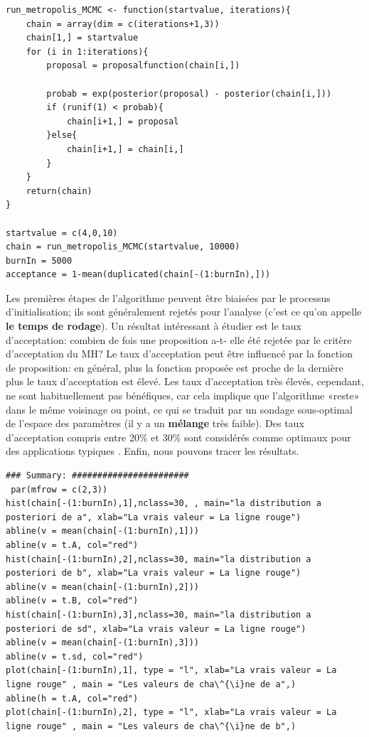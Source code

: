 \begin{Exemple}
\begin{lstlisting}
run_metropolis_MCMC <- function(startvalue, iterations){
    chain = array(dim = c(iterations+1,3))
    chain[1,] = startvalue
    for (i in 1:iterations){
        proposal = proposalfunction(chain[i,])
         
        probab = exp(posterior(proposal) - posterior(chain[i,]))
        if (runif(1) < probab){
            chain[i+1,] = proposal
        }else{
            chain[i+1,] = chain[i,]
        }
    }
    return(chain)
}
 
startvalue = c(4,0,10)
chain = run_metropolis_MCMC(startvalue, 10000)
burnIn = 5000
acceptance = 1-mean(duplicated(chain[-(1:burnIn),]))
\end{lstlisting}
Les premi\`eres \'etapes de l'algorithme peuvent être biais\'ees par le processus d'initialisation; ils sont g\'en\'eralement rejet\'es pour l'analyse (c'est ce qu'on appelle \textbf{le temps de rodage}).  
\newl Un r\'esultat int\'eressant \`a \'etudier est le taux d'acceptation: combien de fois une proposition a-t- elle \'et\'e rejet\'ee par le crit\`ere d'acceptation du MH? Le taux d'acceptation peut être influenc\'e par la fonction de proposition: en g\'en\'eral, plus la fonction propos\'ee est proche de la derni\`ere plus le taux d'acceptation est \'elev\'e.  Les taux d'acceptation tr\`es \'elev\'es, cependant, ne sont habituellement pas b\'en\'efiques, car cela implique que l'algorithme «reste» dans le même voisinage ou point, ce qui se traduit par un sondage sous-optimal de l'espace des param\`etres (il y a un \textbf{m\'elange} tr\`es faible). Des taux d'acceptation compris entre $20\%$ et $30\%$ sont consid\'er\'es comme optimaux pour des applications typiques \cite{BDA_N11}.\newl
Enfin, nous pouvons tracer les r\'esultats. 
\begin{lstlisting}
### Summary: #######################
 par(mfrow = c(2,3))
hist(chain[-(1:burnIn),1],nclass=30, , main="la distribution a posteriori de a", xlab="La vrais valeur = La ligne rouge")
abline(v = mean(chain[-(1:burnIn),1]))
abline(v = t.A, col="red")
hist(chain[-(1:burnIn),2],nclass=30, main="la distribution a posteriori de b", xlab="La vrais valeur = La ligne rouge")
abline(v = mean(chain[-(1:burnIn),2]))
abline(v = t.B, col="red")
hist(chain[-(1:burnIn),3],nclass=30, main="la distribution a posteriori de sd", xlab="La vrais valeur = La ligne rouge")
abline(v = mean(chain[-(1:burnIn),3]))
abline(v = t.sd, col="red")
plot(chain[-(1:burnIn),1], type = "l", xlab="La vrais valeur = La ligne rouge" , main = "Les valeurs de cha\^{\i}ne de a",)
abline(h = t.A, col="red")
plot(chain[-(1:burnIn),2], type = "l", xlab="La vrais valeur = La ligne rouge" , main = "Les valeurs de cha\^{\i}ne de b",)

\end{lstlisting}
\end{Exemple}

